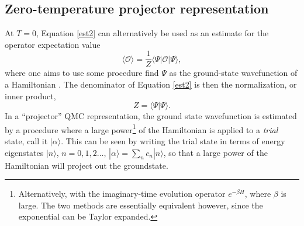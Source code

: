 \documentclass[vecphys]{svmult}
\begin{document}
\subsection{Zero-temperature projector representation} \label{secT0}

At $T=0$, Equation \ref{est2} can alternatively be used as an estimate for the operator expectation value
\begin{equation}
\langle \mathcal{O} \rangle  = \frac{1}{Z} \langle \Psi | \mathcal{O} | \Psi \rangle, \label{zeroExpet}
\end{equation}
where one aims to use some procedure find $\Psi$ as the ground-state wavefunction of a Hamiltonian \cite{Melko:Sandvik05}.  
The denominator of Equation \ref{est2} is then the normalization, or inner product,
\begin{equation}
Z =  \langle \Psi | \Psi \rangle.
\end{equation}
In a ``projector'' QMC representation, the ground state wavefunction is estimated by a procedure where a large power\footnote{Alternatively, with the imaginary-time evolution operator $e^{-\beta H}$, where $\beta$ is large.  The two methods are essentially equivalent however, since the exponential can be Taylor expanded.} of the Hamiltonian is applied to a {\it trial} state, call it $|\alpha \rangle$.  This can be seen by writing the trial state in terms of energy eigenstates $|n \rangle$, $n=0,1,2 \ldots$,
$|\alpha \rangle= \sum_n c_n |n \rangle$, so that 
a large power of the Hamiltonian will project out the groundstate.  
\end{document}
